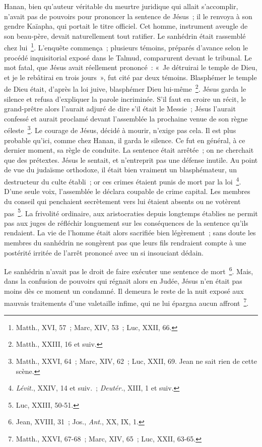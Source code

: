 \documentclass[french,twoside]{book} %
\begin{document}
Hanan, bien qu’auteur véritable du meurtre juridique qui allait s’accomplir, n’avait pas de pouvoirs pour prononcer la sentence de Jésus ; il le renvoya à son gendre Kaïapha, qui portait le titre officiel. Cet homme, instrument aveugle de son beau-père, devait naturellement tout ratifier. Le sanhédrin était rassemblé chez lui \footnote{Matth., XVI, 57 ; Marc, XIV, 53 ; Luc, XXII, 66.}. L’enquête commença ; plusieurs témoins, préparés d’avance selon le procédé inquisitorial exposé dans le Talmud, comparurent devant le tribunal. Le mot fatal, que Jésus avait réellement prononcé : « Je détruirai le temple de Dieu, et je le rebâtirai en trois jours », fut cité par deux témoins. Blasphémer le temple de Dieu était, d’après la loi juive, blasphémer Dieu lui-même \footnote{Matth., XXIII, 16 et suiv.}. Jésus garda le silence et refusa d’expliquer la parole incriminée. S’il faut en croire un récit, le grand-prêtre alors l’aurait adjuré de dire s’il était le Messie ; Jésus l’aurait confessé et aurait proclamé devant l’assemblée la prochaine venue de son règne céleste \footnote{Matth., XXVI, 64 ; Marc, XIV, 62 ; Luc, XXII, 69. Jean ne sait rien de cette scène.}. Le courage de Jésus, décidé à mourir, n’exige pas cela. Il est plus probable qu’ici, comme chez Hanan, il garda le silence. Ce fut en général, à ce dernier moment, sa règle de conduite. La sentence était arrêtée ; on ne cherchait que des prétextes. Jésus le sentait, et n’entreprit pas une défense inutile. Au point de vue du judaïsme orthodoxe, il était bien vraiment un blasphémateur, un destructeur du culte établi ; or ces crimes étaient punis de mort par la loi \footnote{{\itshape Lévit.}, XXIV, 14 et suiv. ; {\itshape Deutér.}, XIII, 1 et suiv.}. D’une seule voix, l’assemblée le déclara coupable de crime capital. Les membres du conseil qui penchaient secrètement vers lui étaient absents ou ne votèrent pas \footnote{Luc, XXIII, 50-51.}. La frivolité ordinaire, aux aristocraties depuis longtemps établies ne permit pas aux juges de réfléchir longuement sur les conséquences de la sentence qu’ils rendaient. La vie de l’homme était alors sacrifiée bien légèrement ; sans doute les membres du sanhédrin ne songèrent pas que leurs fils rendraient compte à une postérité irritée de l’arrêt prononcé avec un si insouciant dédain.\par
Le sanhédrin n’avait pas le droit de faire exécuter une sentence de mort \footnote{ Jean, XVIII, 31 ; Jos., {\itshape Ant}., XX, IX, 1.}. Mais, dans la confusion de pouvoirs qui régnait alors en Judée, Jésus n’en était pas moins dès ce moment un condamné. Il demeura le reste de la nuit exposé aux mauvais traitements d’une valetaille infime, qui ne lui épargna aucun affront \footnote{Matth., XXVI, 67-68 ; Marc, XIV, 65 ; Luc, XXII, 63-65.}.\par
\end{document}
